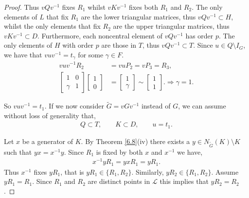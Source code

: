 \documentclass[a4paper , 11pt]{book}
\theoremstyle{definition}
\theoremstyle{remark}
\begin{document}
\begin{proof}
Thus $vQv^{-1}$ fixes $R_1$ whilst $vKv^{-1}$ fixes both $R_1$ and $R_2$. The only elements of $L$ that fix $R_1$ are the lower triangular matrices, thus  $vQv^{-1} \subset H$, whilst the only elements that fix $R_2$ are the upper triangular matrices, thus $vKv^{-1} \subset D$. Furthermore, each noncentral element of $vQv^{-1}$ has order $p$. The only elements of $H$ with order $p$ are those in $T$, thus $vQv^{-1} \subset T$. Since $u \in Q \setminus I_G$, we have that $v u v^{-1} = t_\gamma$ for some $\gamma \in F$.
\begin{align*} v u v^{-1}R_2 &= v u P_2 = v P_3 = R_3,
\\[1.5ex] \begin{bmatrix} 1 & 0\\ \gamma & 1 \end{bmatrix} \begin{bmatrix} 1 \\ 0 \end{bmatrix} &= \begin{bmatrix} 1 \\ \gamma  \end{bmatrix} \sim \begin{bmatrix} 1 \\ 1 \end{bmatrix}. \Longrightarrow \gamma = 1.
\end{align*}

So $v u v^{-1} = t_1$. If we now consider $\widetilde{G} = vGv^{-1}$ instead of $G$, we can assume without loss of generality that,
\begin{align*} Q \subset T, \qquad K \subset D, \qquad u = t_1.
\end{align*}

Let $x$ be a generator of $K$. By Theorem \ref{6.8}(iv) there exists a $y \in N_{\widetilde{G}}(K) \! \setminus \! K$ such that $y x = x^{-1} y$. Since $R_1$ is fixed by both $x$ and $x^{-1}$ we have,
\begin{align*} x^{-1} y R_1 =  y x R_1 = y R_1.
\end{align*}
Thus $x^{-1}$ fixes $y R_1$, that is $y R_1 \in \{ R_1, R_2 \}$. Similarly, $y R_2 \in \{ R_1, R_2 \}$. Assume $y R_1 = R_1$. Since $R_1$ and $R_2$ are distinct points in $\mathscr{L}$ this implies that $y R_2 = R_2$.


\end{proof}
\end{document}
